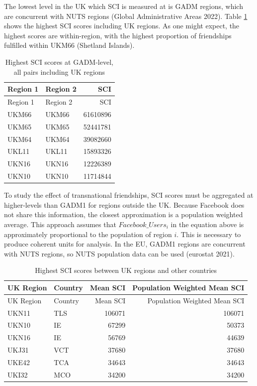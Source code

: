 \documentclass{article}
\begin{document}
The lowest level in the UK which SCI is measured at is GADM regions,
which are concurrent with NUTS regions (Global Administrative Areas
2022). Table \ref{table:loadSCI} shows the highest SCI scores including
UK regions. As one might expect, the highest scores are within-region,
with the highest proportion of friendships fulfilled within UKM66
(Shetland Islands).

\begin{longtable}[]{@{}llr@{}}
\caption{\label{table:loadSCI}Highest SCI scores at GADM-level, all
pairs including UK regions}\tabularnewline
\toprule
Region 1 & Region 2 & SCI \\
\midrule
\endfirsthead
\toprule
Region 1 & Region 2 & SCI \\
\midrule
\endhead
UKM66 & UKM66 & 61610896 \\
UKM65 & UKM65 & 52441781 \\
UKM64 & UKM64 & 39082660 \\
UKL11 & UKL11 & 15893326 \\
UKN16 & UKN16 & 12226389 \\
UKN10 & UKN10 & 11714844 \\
\bottomrule
\end{longtable}

To study the effect of transnational friendships, SCI scores must be
aggregated at higher-levels than GADM1 for regions outside the UK.
Because Facebook does not share this information, the closest
approximation is a population weighted average. This approach assumes
that \(Facebook\_Users_{i}\) in the equation above is approximately
proportional to the population of region \(i\). This is necessary to
produce coherent units for analysis. In the EU, GADM1 regions are
concurrent with NUTS regions, so NUTS population data can be used
(eurostat 2021).

\begin{longtable}[]{@{}llrr@{}}
\caption{\label{table:countrySCI}Highest SCI scores between UK regions
and other countries}\tabularnewline
\toprule
UK Region & Country & Mean SCI & Population Weighted Mean SCI \\
\midrule
\endfirsthead
\toprule
UK Region & Country & Mean SCI & Population Weighted Mean SCI \\
\midrule
\endhead
UKN11 & TLS & 106071 & 106071 \\
UKN10 & IE & 67299 & 50373 \\
UKN16 & IE & 56769 & 44639 \\
UKJ31 & VCT & 37680 & 37680 \\
UKE42 & TCA & 34643 & 34643 \\
UKI32 & MCO & 34200 & 34200 \\
\bottomrule
\end{longtable}
\end{document}
